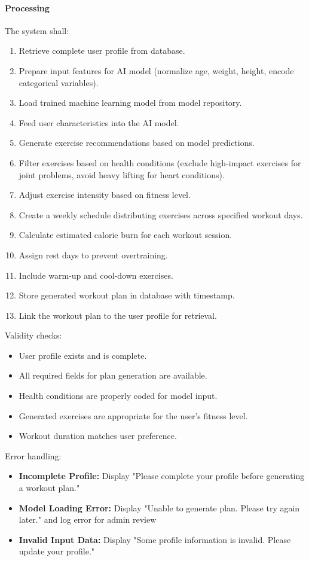 \documentclass[12pt,a4paper]{article}
\begin{document}
\paragraph{Processing}
The system shall:
\begin{enumerate}
    \item Retrieve complete user profile from database.
    \item Prepare input features for AI model (normalize age, weight, height, encode categorical variables).
    \item Load trained machine learning model from model repository.
    \item Feed user characteristics into the AI model.
    \item Generate exercise recommendations based on model predictions.
    \item Filter exercises based on health conditions (exclude high-impact exercises for joint problems, avoid heavy lifting for heart conditions).
    \item Adjust exercise intensity based on fitness level.
    \item Create a weekly schedule distributing exercises across specified workout days.
    \item Calculate estimated calorie burn for each workout session.
    \item Assign rest days to prevent overtraining.
    \item Include warm-up and cool-down exercises.
    \item Store generated workout plan in database with timestamp.
    \item Link the workout plan to the user profile for retrieval.
\end{enumerate}

Validity checks:
\begin{itemize}
    \item User profile exists and is complete.
    \item All required fields for plan generation are available.
    \item Health conditions are properly coded for model input.
    \item Generated exercises are appropriate for the user's fitness level.
    \item Workout duration matches user preference.
\end{itemize}

Error handling:
\begin{itemize}
    \item \textbf{Incomplete Profile:} Display "Please complete your profile before generating a workout plan."
    \item \textbf{Model Loading Error:} Display "Unable to generate plan. Please try again later." and log error for admin review
    \item \textbf{Invalid Input Data:} Display "Some profile information is invalid. Please update your profile."
\end{itemize}
\end{document}
